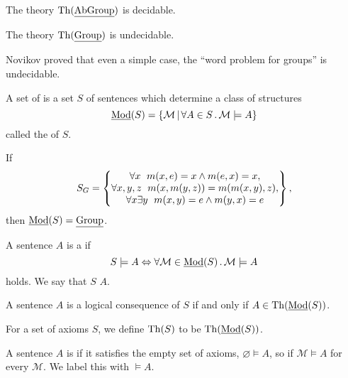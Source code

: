 \begin{theorem}[Szmielew]
  The theory $\operatorname{Th}(\underline{\text{AbGroup}})$ is decidable.
\end{theorem}

\begin{theorem}[Novikov]
  The theory $\operatorname{Th}(\underline{\text{Group}})$ is undecidable.
\end{theorem}

\begin{remark}
  Novikov proved that even a simple case, the \enquote{word problem for groups}
  is undecidable.
\end{remark}

A set of  is a set $S$ of sentences which determine a class of
structures
\[
  \underline{\text{Mod}}(S) = \{ \mathcal{M} \,|\, \forall A \in S \,.\, \mathcal{M}
  \models A \}
\]
called the  of $S$.

\begin{example}
  If
  \[
	S_G =
	\begin{Bmatrix}
	  \forall x \;\   m(x,e) = x \land m(e,x) = x, \\
	  \forall x, y, z \;\  m(x, m(y,z)) = m(m(x,y), z), \\
	  \forall x \exists y \;\   m(x,y) = e \land m(y,x) = e
	\end{Bmatrix},
  \]
  then $\underline{\text{Mod}}(S) = \underline{\text{Group}}$.
\end{example}

\begin{definition}
  A sentence $A$ is a  if
  \[
	S \models A \Leftrightarrow \forall \mathcal{M} \in \underline{\text{Mod}}(S) \,.\, \mathcal{M}
	\models A
  \]
  holds.
  We say that $S$  $A$.
\end{definition}

\begin{remark}
  A sentence $A$ is a logical consequence of $S$ if and only if $A \in
  \operatorname{Th}(\underline{\text{Mod}}(S))$.
\end{remark}

\begin{remark}
  For a set of axioms $S$, we define $\operatorname{Th}(S)$ to be $\operatorname{Th}(\underline{\text{Mod}}(S))$.
\end{remark}

\begin{definition}
  A sentence $A$ is  if it satisfies the empty set of
  axioms, $\varnothing \models A$, so if $\mathcal{M} \models A$ for every
  $\mathcal{M}$.
  We label this with $\models A$.
\end{definition}

